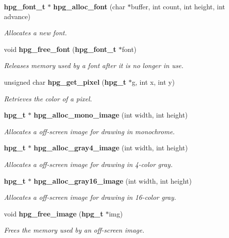 \begin{CompactItemize}
{\bf hpg\_\-font\_\-t} $\ast$ {\bf hpg\_\-alloc\_\-font} (char $\ast$buffer, int count, int height, int advance)
\begin{CompactList}\small\item\em Allocates a new font.\item\end{CompactList}\item 
void {\bf hpg\_\-free\_\-font} ({\bf hpg\_\-font\_\-t} $\ast$font)
\begin{CompactList}\small\item\em Releases memory used by a font after it is no longer in use.\item\end{CompactList}\item 
unsigned char {\bf hpg\_\-get\_\-pixel} ({\bf hpg\_\-t} $\ast$g, int x, int y)
\begin{CompactList}\small\item\em Retrieves the color of a pixel.\item\end{CompactList}\item 
{\bf hpg\_\-t} $\ast$ {\bf hpg\_\-alloc\_\-mono\_\-image} (int width, int height)
\begin{CompactList}\small\item\em Allocates a off-screen image for drawing in monochrome.\item\end{CompactList}\item 
{\bf hpg\_\-t} $\ast$ {\bf hpg\_\-alloc\_\-gray4\_\-image} (int width, int height)
\begin{CompactList}\small\item\em Allocates a off-screen image for drawing in 4-color gray.\item\end{CompactList}\item 
{\bf hpg\_\-t} $\ast$ {\bf hpg\_\-alloc\_\-gray16\_\-image} (int width, int height)
\begin{CompactList}\small\item\em Allocates a off-screen image for drawing in 16-color gray.\item\end{CompactList}\item 
void {\bf hpg\_\-free\_\-image} ({\bf hpg\_\-t} $\ast$img)
\begin{CompactList}\small\item\em Frees the memory used by an off-screen image.\item\end{CompactList}\item 

\end{CompactItemize}
